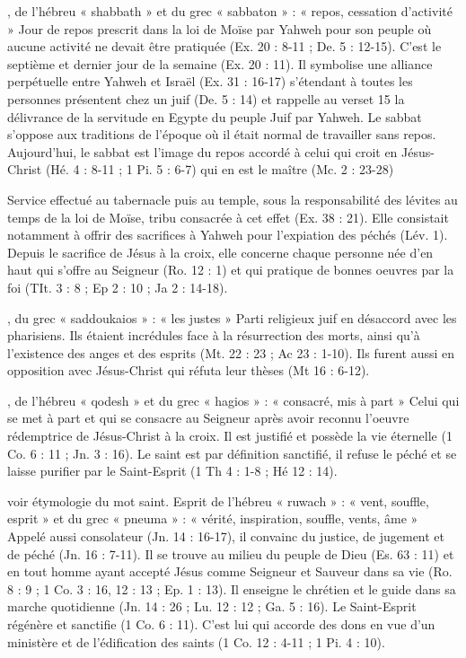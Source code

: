 \begin{multicols}{2}
, de l'hébreu « shabbath » et du grec « sabbaton » : « repos, cessation d'activité »
Jour de repos prescrit dans la loi de Moïse par Yahweh pour son peuple où aucune activité ne devait être pratiquée (Ex. 20 : 8-11 ; De. 5 : 12-15). C'est le septième et dernier jour de la semaine (Ex. 20 : 11). Il symbolise une alliance perpétuelle entre Yahweh et Israël (Ex. 31 : 16-17) s'étendant à toutes les personnes présentent chez un juif (De. 5 : 14) et rappelle au verset 15 la délivrance de la servitude en Egypte du peuple Juif par Yahweh. Le sabbat s'oppose aux traditions de l'époque où il était normal de travailler sans repos. Aujourd'hui, le sabbat est l'image du repos accordé à celui qui croit en Jésus-Christ (Hé. 4 : 8-11 ; 1 Pi. 5 : 6-7) qui en est le maître (Mc. 2 : 23-28)


Service effectué au tabernacle puis au temple, sous la responsabilité des lévites au temps de la loi de Moïse, tribu consacrée à cet effet (Ex. 38 : 21). Elle consistait notamment à offrir des sacrifices à Yahweh pour l'expiation des péchés (Lév. 1). Depuis le sacrifice de Jésus à la croix, elle concerne chaque personne née d'en haut qui s'offre au Seigneur (Ro. 12 : 1) et qui pratique de bonnes oeuvres par la foi (TIt. 3 : 8 ; Ep 2 : 10 ; Ja 2 : 14-18).


, du grec « saddoukaios » : « les justes »
Parti religieux juif en désaccord avec les pharisiens. Ils étaient incrédules face à la résurrection des morts, ainsi qu'à l'existence des anges et des esprits (Mt. 22 : 23 ; Ac 23 : 1-10). Ils furent aussi en opposition avec Jésus-Christ qui réfuta leur thèses (Mt 16 : 6-12).


, de l'hébreu « qodesh » et du grec « hagios » : « consacré, mis à part »
Celui qui se met à part et qui se consacre au Seigneur après avoir reconnu l'oeuvre rédemptrice de Jésus-Christ à la croix. Il est justifié et possède la vie éternelle (1 Co. 6 : 11 ; Jn. 3 : 16). Le saint est par définition sanctifié, il refuse le péché et se laisse purifier par le Saint-Esprit (1 Th 4 : 1-8 ; Hé 12 : 14).


voir étymologie du mot saint. Esprit de l'hébreu « ruwach » : « vent, souffle, esprit » et du grec « pneuma » : « vérité, inspiration, souffle, vents, âme »
Appelé aussi consolateur (Jn. 14 : 16-17), il convainc du justice, de jugement et de péché (Jn. 16 : 7-11). Il se trouve au milieu du peuple de Dieu (Es. 63 : 11) et en tout homme ayant accepté Jésus comme Seigneur et Sauveur dans sa vie (Ro. 8 : 9 ; 1 Co. 3 : 16, 12 : 13 ; Ep. 1 : 13). Il enseigne le chrétien et le guide dans sa marche quotidienne (Jn. 14 : 26 ; Lu. 12 : 12 ; Ga. 5 : 16). Le Saint-Esprit régénère et sanctifie (1 Co. 6 : 11). C'est lui qui accorde des dons en vue d'un ministère et de l'édification des saints (1 Co. 12 : 4-11 ; 1 Pi. 4 : 10).



\end{multicols}
